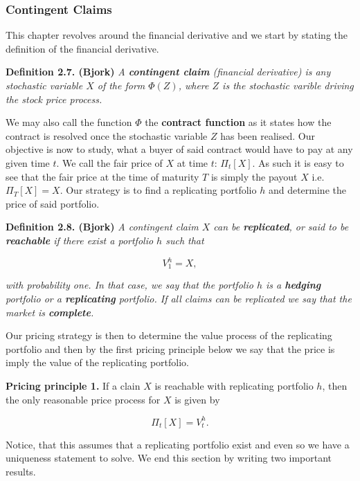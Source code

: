 \documentclass[a4paper,12pt,openany]{book}
\begin{document}
\hypertarget{contingent-claims}{%
\subsubsection{Contingent Claims}\label{contingent-claims}}

This chapter revolves around the financial derivative and we start by stating the definition of the financial derivative.

\textbf{Definition 2.7. (Bjork)} \emph{A \textbf{contingent claim} (financial derivative) is \emph{any} stochastic variable \(X\) of the form \(\Phi(Z)\), where \(Z\) is the stochastic varible driving the stock price process.}

We may also call the function \(\Phi\) the \textbf{contract function} as it states how the contract is resolved once the stochastic variable \(Z\) has been realised. Our objective is now to study, what a buyer of said contract would have to pay at any given time \(t\). We call the fair price of \(X\) at time \(t\): \(\Pi_t[X]\). As such it is easy to see that the fair price at the time of maturity \(T\) is simply the payout \(X\) i.e.~\(\Pi_T[X]=X\). Our strategy is to find a replicating portfolio \(h\) and determine the price of said portfolio.

\textbf{Definition 2.8. (Bjork)} \emph{A contingent claim \(X\) can be \textbf{replicated}, or said to be \textbf{reachable} if there exist a portfolio \(h\) such that}

\[
V_1^h=X,
\]

\emph{with probability one. In that case, we say that the portfolio \(h\) is a \textbf{hedging} portfolio or a \textbf{replicating} portfolio. If all claims can be replicated we say that the market is \textbf{complete}.}

Our pricing strategy is then to determine the value process of the replicating portfolio and then by the first pricing principle below we say that the price is imply the value of the replicating portfolio.

\textbf{Pricing principle 1.} If a clain \(X\) is reachable with replicating portfolio \(h\), then the only reasonable price process for \(X\) is given by

\[
\Pi_t[X]=V_t^h.
\]

Notice, that this assumes that a replicating portfolio exist and even so we have a uniqueness statement to solve. We end this section by writing two important results.
\end{document}
